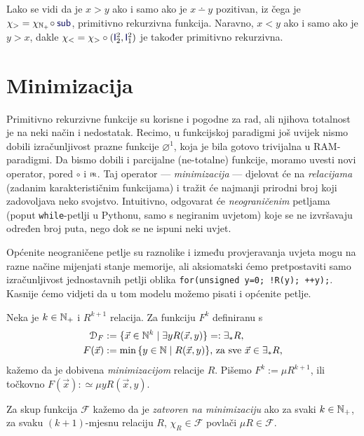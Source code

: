 \begin{primjer}[{name=[primitivna rekurzivnost relacija strogog uređaja]}]\label{pr:m-v}
Lako se vidi da je $x>y$ ako i samo ako je $x\dotminus y$ pozitivan, iz čega je $\chi_>=\chi_{\N_+}\!\circ\f{sub}$, pri\-mi\-tiv\-no rekurzivna funkcija. Naravno, $x<y$ ako i samo ako je $y>x$, dakle $\chi_<=\chi_>\circ(\f I_2^2,\f I_1^2)$ je također primitivno rekurzivna.
\end{primjer}

\section{Minimizacija}

Primitivno rekurzivne funkcije su korisne i pogodne za rad, ali njihova totalnost je na neki način i nedostatak. Recimo, u funkcijskoj paradigmi još uvijek nismo dobili izračunljivost prazne funkcije $\varnothing^1$, koja je bila gotovo trivijalna u RAM-paradigmi. Da bismo dobili i parcijalne (ne-totalne) funkcije, moramo uvesti novi operator, pored $\circ$ i $\pr$. Taj operator --- \emph{minimizacija} --- djelovat će na \emph{relacijama} (zadanim karakterističnim funkcijama) i tražit će najmanji prirodni broj koji zadovoljava neko svojstvo. Intuitivno, odgovarat će \emph{neograničenim} petljama (poput \texttt{while}-petlji u Pythonu, samo s negiranim uvjetom) koje se ne izvršavaju određen broj puta, nego dok se ne ispuni neki uvjet.

Općenite neograničene petlje su raznolike i između provjeravanja uvjeta mogu na razne načine mijenjati stanje memorije, ali aksiomatski ćemo pretpostaviti samo izračunljivost jednostavnih petlji oblika
\texttt{for(unsigned y=0; !R(y); ++y);}.
Kasnije ćemo vidjeti da u tom modelu možemo pisati i općenite petlje.

\begin{definicija}[{name=[minimizacija]}]
Neka je $k\in{\mathbb N}_+$ i $R^{k+1}$ relacija. Za funkciju $F^k$ definiranu s
\begin{align}
    \label{eq:dommu}\mathcal D_{F}&:=\{\vec x\in{\mathbb N}^k\mid\exists yR(\vec x,y)\}=:\exists_*R\text,\\
    F(\vec x)&:=\min\,\{y\in{\mathbb N}\mid R(\vec x,y)\}\text{, za sve $\vec x\in\exists_* R$,}
\end{align}
kažemo da je dobivena \emph{minimizacijom} relacije $R$. Pišemo $F^k:=\mu R^{k+1}$, ili točkovno
$F(\vec x):\simeq\mu yR(\vec x,y)$.

    Za skup funkcija $\mathcal F$ kažemo da je \emph{zatvoren na minimizaciju} ako za svaki $k\in{\mathbb N}_+$, za svaku $(k+1)$-mjesnu relaciju $R$, $\chi_R\in\mathcal F$ povlači $\mu R\in\mathcal F$. 
\end{definicija}

